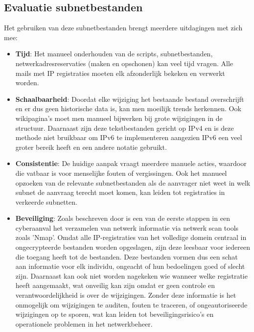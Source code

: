 
\subsection{Evaluatie subnetbestanden}
\label{uitdagingen}
Het gebruiken van deze subnetbestanden brengt meerdere uitdagingen met zich mee:
\begin{itemize}
    \item \textbf{Tijd}: Het manueel onderhouden van de scripts, subnetbestanden, netwerkadresreservaties (maken en opschonen) kan veel tijd vragen. Alle mails met IP registraties moeten elk afzonderlijk bekeken en verwerkt worden.
    \item \textbf{Schaalbaarheid}: Doordat elke wijziging het bestaande bestand overschrijft en er dus geen historische data is, kan men moeilijk trends herkennen. Ook wikipagina's moet men manueel bijwerken bij grote wijzigingen in de structuur. Daarnaast zijn deze tekstbestanden gericht op IPv4 en is deze methode niet bruikbaar om IPv6 te implementeren aangezien IPv6 een veel groter bereik heeft en een andere notatie gebruikt.
    \item \textbf{Consistentie}: De huidige aanpak vraagt meerdere manuele acties, waardoor die vatbaar is voor menselijke fouten of vergissingen. Ook het manueel opzoeken van de relevante subnetbestanden als de aanvrager niet weet in welk subnet de aanvraag terecht moet komen, kan leiden tot registraties in verkeerde subnetten.  
    \item \textbf{Beveiliging}: Zoals beschreven door \textcite{Liao2020} is een van de eerste stappen in een cyberaanval het verzamelen van netwerk informatie via netwerk scan tools zoals 'Nmap'. Omdat alle IP-registraties van het volledige domein centraal in ongecrypteerde bestanden worden opgeslagen, zijn deze leesbaar voor iedereen die toegang heeft tot de bestanden. Deze bestanden vormen dus een schat aan informatie voor elk individu, ongeacht of hun bedoelingen goed of slecht zijn. Daarnaast kan ook niet worden nagekeken wie wanneer welke registratie heeft aangemaakt, wat onveilig kan zijn omdat er geen controle en verantwoordelijkheid is over de wijzigingen. Zonder deze informatie is het onmogelijk om wijzigingen te auditen, fouten te traceren, of ongeautoriseerde wijzigingen op te sporen, wat kan leiden tot beveiligingsrisico's en operationele problemen in het netwerkbeheer.
\end{itemize}


